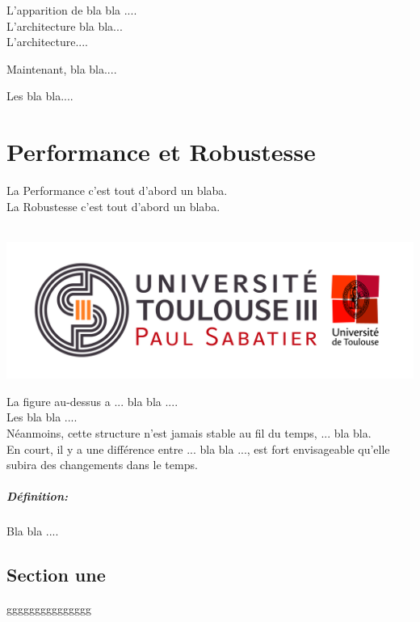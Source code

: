 \documentclass[12pt, a4paper, openany]{report}
\begin{document}
 L'apparition de bla bla ....\\
 
 L'architecture bla bla...\\
 
 L'architecture....
 
 Maintenant, bla bla....
 
 Les bla bla....
 



\chapter{Performance et Robustesse}
 La Performance c’est tout d’abord un blaba.\\
 
 La Robustesse c’est tout d’abord un blaba.\\ \\
 \begin{center}
   \includegraphics[scale=0.5]{Logo_UT3.jpg}
   \label{fig1}
 \end{center}
 
 La figure au-dessus a ... bla bla ....\\
 
 Les bla bla ....\\
 
 Néanmoins, cette structure n’est jamais stable au fil du temps, ... bla bla.\\
  
 En court, il y a une différence entre ... bla bla ..., est fort envisageable qu’elle subira des changements dans le temps.
 
 \paragraph{Définition:}
  Bla bla ....

 \section{Section une}
  ggggggggggggggg
\end{document}
